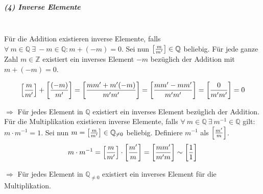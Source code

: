 \documentclass{scrreprt}
\begin{document}
\newpage
\subparagraph{(4) Inverse Elemente}

\:\\
Für die Addition existieren inverse Elemente, falls
$\forall \: m \in \mathbb{Q} \: \exists \: -m \in \mathbb{Q} \colon m + (-m)
= 0$.
Sei nun $\qty[\frac{m}{m'}] \in \mathbb{Q}$ beliebig.
Für jede ganze Zahl $m \in \mathbb{Z}$ existiert ein inverses Element $-m$
bezüglich der Addition mit $m + (-m) = 0$.

\[
  \qty[\frac{m}{m'}] + \qty[\frac{(-m)}{m'}] = \qty[\frac{mm' + m'(-m)}{m'm'}]
  = \qty[\frac{mm' - mm'}{m'm'}] = \qty[\frac{0}{m'm'}] = 0
\]

$\Rightarrow$ Für jedes Element in $\mathbb{Q}$ existiert ein inverses
Element bezüglich der Addition. \\

\noindent
Für die Multiplikation existieren inverse Elemente, falls
$\forall \: m \in \mathbb{Q} \: \exists \: m^{-1} \in \mathbb{Q}$ gilt: \\
$m \cdot m^{-1} = 1$.
Sei nun $m = \qty[\frac{m}{m'}] \in \mathbb{Q}_{\ne 0}$ beliebig.
Definiere $m^{-1}$ als $\qty[\frac{m'}{m}]$.
\[
  m \cdot m^{-1} = \qty[\frac{m}{m'}] \cdot \qty[\frac{m'}{m}]
  = \qty[\frac{mm'}{m'm}]
  \sim \qty[\frac{1}{1}]
\]

$\Rightarrow$ Für jedes Element in $\mathbb{Q}_{\ne 0}$ existiert ein inverses
Element für die Multiplikation.
\end{document}
